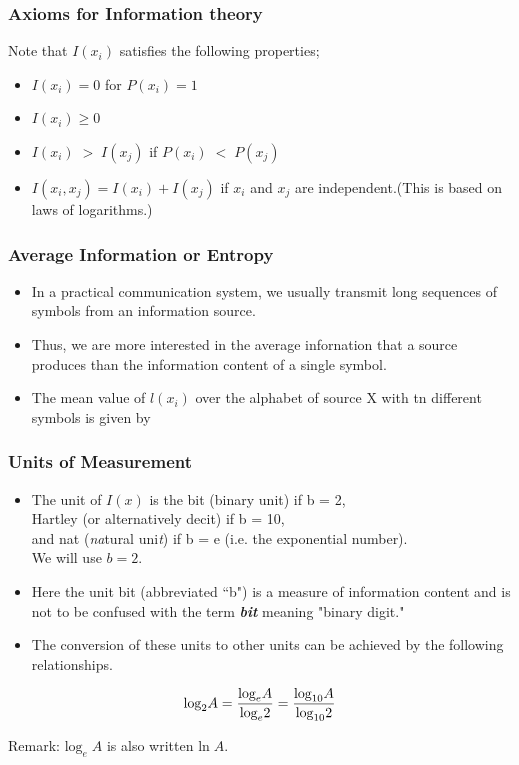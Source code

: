 \documentclass[a4]{beamer}
\begin{document}
\begin{frame}


\frametitle{Axioms for Information theory}
Note that $I(x_i)$ satisfies the following properties;
\begin{itemize}
\item $I(x_i) = 0 $ for $P(x_i) = 1$ %
\item $I(x_i) \geq 0 $
\item $I(x_i) \; >\; I(x_j)$  if $P(x_i)\; < \; P(x_j)$
\item $I(x_i, x_j)  = I(x_i) + I(x_j)$ if $x_i$ and $x_j$ are independent.(This is based on laws of logarithms.)
\end{itemize}
\end{frame}











\begin{frame}
\frametitle{Average Information or Entropy}
\begin{itemize}
	\item In a practical communication system, we usually transmit long sequences of symbols from an
	information source. \item Thus, we are more interested in the average infornation that a source produces
	than the information content of a single symbol.
	\item The mean value of $ l(x_i)$ over the alphabet of source X with tn different symbols is given by
	\[ \]
\end{itemize}
\end{frame}
\begin{frame}
\frametitle{Units of Measurement}
\begin{itemize}
\item The unit of $I(x)$ is the bit (binary unit) if b = 2, \\ Hartley (or alternatively decit) if b = 10,\\ and nat (\emph{na}tural uni\emph{t}) if b = e (i.e. the exponential number).  \\ We will use $b = 2$. \item Here the unit bit (abbreviated ``b") is a measure of information content and is not to be confused with the term \emph{\textbf{bit}} meaning "binary digit." \item The conversion of these
units to other units can be achieved by the following relationships.
\end{itemize}

\[ \mbox{log}_2A = {\mbox{log}_e A \over \mbox{log} _e 2}   = {\mbox{log}_{10} A \over \mbox{log}_{10} 2}  \]

Remark: $ \mbox{log}_e\; A $ is also written $\mbox{ln}\; A$.
\end{frame}
\end{document}
